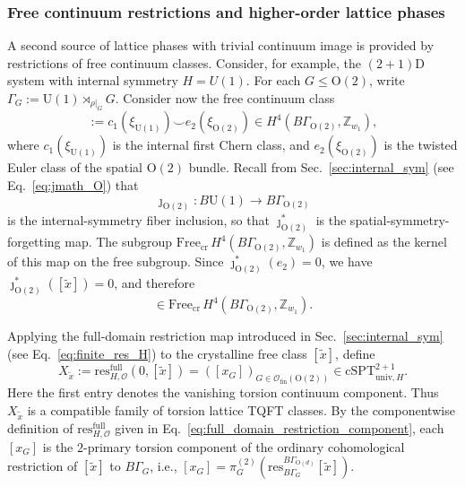 \documentclass[aps,prx,reprint,superscriptaddress,twocolumn,amsmath,amssymb,amsfonts, nofootinbib]{revtex4-2}
\newcommand{\U}{\text{U}}
\newcommand{\ofin}{\mathcal{O}_{\text{fin}}}
\newcommand{\res}{\text{res}}
\theoremstyle{apsstyle}
\begin{document}
\subsubsection{Free continuum restrictions and higher-order lattice phases}
\label{sec:free_shadow_example}

A second source of lattice phases with trivial continuum image is provided by restrictions of free continuum classes. Consider, for example, the $(2+1)$D system with internal symmetry $H=U(1)$. For each $G\leq \mathrm O(2)$, write $\Gamma_G:=\U(1)\rtimes_{\rho|_G}G$. Consider now the free continuum class
\begin{equation}
[\widetilde x] := c_{1}(\xi_{\U(1)})\smile e_{2}(\xi_{\mathrm{O}(2)}) \in
H^{4}\left( B\Gamma_{\mathrm O(2)}, \mathbb Z_{w_{1}} \right),
\label{eq:free_shadow_continuum_class}
\end{equation}
where $c_{1}(\xi_{\U(1)})$ is the internal first Chern class, and $e_{2}(\xi_{\mathrm{O}(2)})$ is the twisted Euler class of the spatial $\mathrm{O}(2)$ bundle. 
Recall from Sec.~\ref{sec:internal_sym} (see Eq.~\ref{eq:jmath_O}) that
\begin{equation*}
\jmath_{\mathrm O(2)}:
B\U(1)\longrightarrow B\Gamma_{\mathrm O(2)}
\end{equation*}
is the internal-symmetry fiber inclusion, so that $\jmath_{\mathrm O(2)}^*$ is the spatial-symmetry-forgetting map. The subgroup $\mathrm{Free}_{\mathrm{cr}}\, H^{4}(B\Gamma_{\mathrm O(2)},\mathbb Z_{w_1})$ is defined as the kernel of this map on the free subgroup.
Since $\jmath_{\mathrm O(2)}^{*}(e_2)=0$, we have $\jmath_{\mathrm O(2)}^{*}([\widetilde x])=0$, and therefore
\begin{equation*}
[\widetilde x] \in \mathrm{Free}_{\mathrm{cr}}\,
H^{4}\left(B\Gamma_{\mathrm O(2)},\mathbb Z_{w_1}\right).
\end{equation*}

Applying the full-domain restriction map introduced in Sec.~\ref{sec:internal_sym} (see Eq.~\ref{eq:finite_res_H}) to the crystalline free class $[\widetilde x]$, define
\begin{equation}
X_{\widetilde x}
:=\res^{\mathrm{full}}_{H,\mathcal O}(0,[\widetilde x])
= \left([x_G]\right)_{G\in\ofin(\mathrm O(2))}
\in \mathrm{cSPT}^{2+1}_{\mathrm{univ},H}.
\label{eq:free_shadow_components}
\end{equation}
Here the first entry denotes the vanishing torsion continuum component. Thus $X_{\widetilde x}$ is a compatible family of torsion lattice TQFT classes. By the componentwise definition of $\res^{\mathrm{full}}_{H,\mathcal O}$ given in Eq.~\ref{eq:full_domain_restriction_component}, each $[x_G]$ is the $2$-primary torsion component of the ordinary cohomological restriction of $[\widetilde x]$ to $B\Gamma_G$, i.e., $[x_{G}]=\pi_{G}^{(2)}\left(\res^{B\Gamma_{\mathrm{O}(d)}}_{B\Gamma_{G}}[\widetilde{x}]\right)$.
\end{document}
